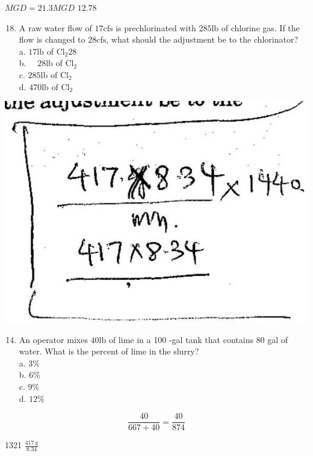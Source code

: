 \documentclass[10pt]{article}
\begin{document}
$M G D=21.3 M G D$ $12.78$

\begin{enumerate}
  \setcounter{enumi}{17}
  \item A raw water flow of $17 \mathrm{cfs}$ is prechlorinated with $285 \mathrm{lb}$ of chlorine gas. If the flow is changed to $28 \mathrm{cfs}$, what should the adjustment be to the chlorinator?\\
a. $17 \mathrm{lb}$ of $\mathrm{Cl}_{2} 28$\\
b. $\quad 28 \mathrm{lb}$ of $\mathrm{Cl}_{2}$\\
c. $285 \mathrm{lb}$ of $\mathrm{Cl}_{2}$\\
d. $470 \mathrm{lb}$ of $\mathrm{Cl}_{2}$
\end{enumerate}

\includegraphics[max width=\textwidth]{2022_11_11_ca6a6c1a0324ee23e523g-53(1)}

\begin{enumerate}
  \setcounter{enumi}{13}
  \item An operator mixes $40 \mathrm{lb}$ of lime in a 100 -gal tank that contains 80 gal of water. What is the percent of lime in the slurry?\\
a. $3 \%$\\
b. $6 \%$\\
c. $9 \%$\\
d. $12 \%$
\end{enumerate}

$$
\frac{40}{667+40}=\frac{40}{874}
$$

1321 $\frac{417 \mathrm{~g}}{8.34}$
\end{document}
